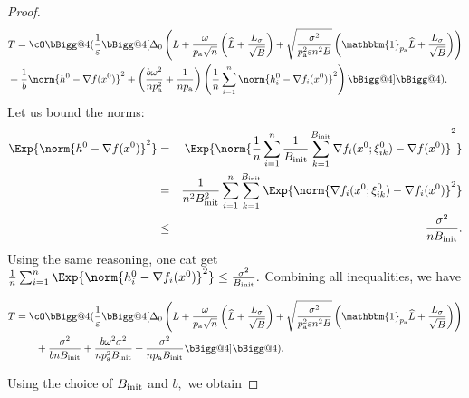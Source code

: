 \documentclass{article}
\makeatletter
\newcommand*{\probavailable}{\ensuremath{p_{\textnormal{a}}}}
\newcommand{\vast}{\bBigg@{4}}
\makeatother
\begin{document}
\begin{proof}
    \begin{align*}
        &T=\cO\vast(\frac{1}{\varepsilon}\vast[\Delta_0\left(L + \frac{\omega}{\probavailable \sqrt{n}} \left(\widehat{L} + \frac{L_{\sigma}}{\sqrt{B}}\right) + \sqrt{\frac{\sigma^2}{\probavailable^2 \varepsilon n^2 B}}\left(\mathbbm{1}_{\probavailable}\widehat{L} + \frac{L_{\sigma}}{\sqrt{B}}\right)\right)\\
        &+ \frac{1}{b} \norm{h^{0} - \nabla f(x^{0})}^2 + \left(\frac{b \omega^2}{n \probavailable^2} + \frac{1}{n \probavailable}\right)\left(\frac{1}{n}\sum_{i=1}^n\norm{h^{0}_i - \nabla f_i(x^{0})}^2\right)\vast]\vast).
    \end{align*}
    Let us bound the norms:
    \begin{eqnarray*}
        \Exp{\norm{h^{0} - \nabla f(x^{0})}^2} &=& \Exp{\norm{\frac{1}{n} \sum_{i=1}^n \frac{1}{B_{\textnormal{init}}} \sum_{k = 1}^{B_{\textnormal{init}}} \nabla f_i(x^0; \xi^0_{ik}) - \nabla f(x^{0})}^2} \\
        &=& \frac{1}{n^2 B_{\textnormal{init}}^2}\sum_{i=1}^n \sum_{k = 1}^{B_{\textnormal{init}}} \Exp{\norm{\nabla f_i(x^0; \xi^0_{ik}) - \nabla f_i(x^{0})}^2}\\
        &\leq& \frac{\sigma^2}{n B_{\textnormal{init}}}.
    \end{eqnarray*}
    Using the same reasoning, one cat get $\frac{1}{n}\sum_{i=1}^n\Exp{\norm{h^{0}_i - \nabla f_i(x^{0})}^2} \leq \frac{\sigma^2}{B_{\textnormal{init}}}.$ 
    Combining all inequalities, we have

    \begin{align*}
      T&=\cO\vast(\frac{1}{\varepsilon}\vast[\Delta_0\left(L + \frac{\omega}{\probavailable \sqrt{n}} \left(\widehat{L} + \frac{L_{\sigma}}{\sqrt{B}}\right) + \sqrt{\frac{\sigma^2}{\probavailable^2 \varepsilon n^2 B}}\left(\mathbbm{1}_{\probavailable}\widehat{L} + \frac{L_{\sigma}}{\sqrt{B}}\right)\right)\\
      &\qquad + \frac{\sigma^2}{b n B_{\textnormal{init}}}  + \frac{b \omega^2 \sigma^2}{n \probavailable^2 B_{\textnormal{init}}} + \frac{\sigma^2}{n \probavailable B_{\textnormal{init}}}\vast]\vast).
    \end{align*}

    Using the choice of $B_{\textnormal{init}}$ and $b,$ we obtain


\end{proof}
\end{document}
